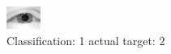 \begin{figure}[h!]
\begin{center}
\includegraphics[width=0.60\columnwidth]{figures/ID2377_class_1_target_2.png}
\end{center}
\caption{ Classification: 1 actual target: 2}
\label{fig:ID2377_class_1_target_2}
\end{figure}
